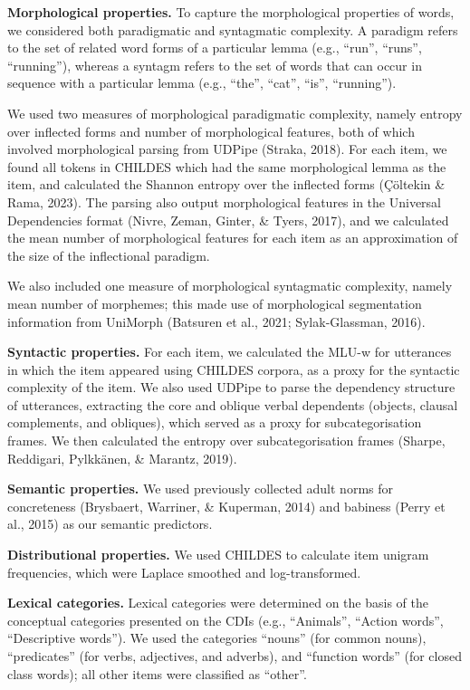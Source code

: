 \documentclass[10pt, letterpaper]{article}
\begin{document}
\textbf{Morphological properties.} To capture the morphological
properties of words, we considered both paradigmatic and syntagmatic
complexity. A paradigm refers to the set of related word forms of a
particular lemma (e.g., ``run'', ``runs'', ``running''), whereas a
syntagm refers to the set of words that can occur in sequence with a
particular lemma (e.g., ``the'', ``cat'', ``is'', ``running'').

We used two measures of morphological paradigmatic complexity, namely
entropy over inflected forms and number of morphological features, both
of which involved morphological parsing from UDPipe (Straka, 2018). For
each item, we found all tokens in CHILDES which had the same
morphological lemma as the item, and calculated the Shannon entropy over
the inflected forms (Çöltekin \& Rama, 2023). The parsing also output
morphological features in the Universal Dependencies format (Nivre,
Zeman, Ginter, \& Tyers, 2017), and we calculated the mean number of
morphological features for each item as an approximation of the size of
the inflectional paradigm.

We also included one measure of morphological syntagmatic complexity,
namely mean number of morphemes; this made use of morphological
segmentation information from UniMorph (Batsuren et al., 2021;
Sylak-Glassman, 2016).

\textbf{Syntactic properties.} For each item, we calculated the MLU-w
for utterances in which the item appeared using CHILDES corpora, as a
proxy for the syntactic complexity of the item. We also used UDPipe to
parse the dependency structure of utterances, extracting the core and
oblique verbal dependents (objects, clausal complements, and obliques),
which served as a proxy for subcategorisation frames. We then calculated
the entropy over subcategorisation frames (Sharpe, Reddigari, Pylkkänen,
\& Marantz, 2019).

\textbf{Semantic properties.} We used previously collected adult norms
for concreteness (Brysbaert, Warriner, \& Kuperman, 2014) and babiness
(Perry et al., 2015) as our semantic predictors.

\textbf{Distributional properties.} We used CHILDES to calculate item
unigram frequencies, which were Laplace smoothed and log-transformed.

\textbf{Lexical categories.} Lexical categories were determined on the
basis of the conceptual categories presented on the CDIs (e.g.,
``Animals'', ``Action words'', ``Descriptive words''). We used the
categories ``nouns'' (for common nouns), ``predicates'' (for verbs,
adjectives, and adverbs), and ``function words'' (for closed class
words); all other items were classified as ``other''.
\end{document}
